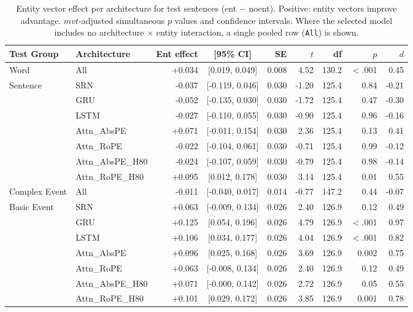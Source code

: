 \begin{table}[t]
\centering\small
\begin{tabular}{@{}llrcrrrrr@{}}
\toprule
\textbf{Test Group} & \textbf{Architecture} & \textbf{Ent effect} & \textbf{[95\% CI]} & \textbf{SE} & $t$ & \textbf{df} & $p$ & $d$ \\
\midrule
Word & All & +0.034 & [0.019, 0.049] & 0.008 & 4.52 & 130.2 & $<$.001 & 0.45 \\
\addlinespace
Sentence & SRN & -0.037 & [-0.119, 0.046] & 0.030 & -1.20 & 125.4 & 0.84 & -0.21 \\
 & GRU & -0.052 & [-0.135, 0.030] & 0.030 & -1.72 & 125.4 & 0.47 & -0.30 \\
 & LSTM & -0.027 & [-0.110, 0.055] & 0.030 & -0.90 & 125.4 & 0.96 & -0.16 \\
 & Attn\_AbsPE & +0.071 & [-0.011, 0.154] & 0.030 & 2.36 & 125.4 & 0.13 & 0.41 \\
 & Attn\_RoPE & -0.022 & [-0.104, 0.061] & 0.030 & -0.71 & 125.4 & 0.99 & -0.12 \\
 & Attn\_AbsPE\_H80 & -0.024 & [-0.107, 0.059] & 0.030 & -0.79 & 125.4 & 0.98 & -0.14 \\
 & Attn\_RoPE\_H80 & +0.095 & [0.012, 0.178] & 0.030 & 3.14 & 125.4 & 0.01 & 0.55 \\
\addlinespace
Complex Event & All & -0.011 & [-0.040, 0.017] & 0.014 & -0.77 & 147.2 & 0.44 & -0.07 \\
\addlinespace
Basic Event & SRN & +0.063 & [-0.009, 0.134] & 0.026 & 2.40 & 126.9 & 0.12 & 0.49 \\
 & GRU & +0.125 & [0.054, 0.196] & 0.026 & 4.79 & 126.9 & $<$.001 & 0.97 \\
 & LSTM & +0.106 & [0.034, 0.177] & 0.026 & 4.04 & 126.9 & $<$.001 & 0.82 \\
 & Attn\_AbsPE & +0.096 & [0.025, 0.168] & 0.026 & 3.69 & 126.9 & 0.002 & 0.75 \\
 & Attn\_RoPE & +0.063 & [-0.008, 0.134] & 0.026 & 2.40 & 126.9 & 0.12 & 0.49 \\
 & Attn\_AbsPE\_H80 & +0.071 & [-0.000, 0.142] & 0.026 & 2.72 & 126.9 & 0.05 & 0.55 \\
 & Attn\_RoPE\_H80 & +0.101 & [0.029, 0.172] & 0.026 & 3.85 & 126.9 & 0.001 & 0.78 \\
\bottomrule
\end{tabular}
\caption{Entity vector effect per architecture for test sentences (ent $-$ noent). Positive: entity vectors improve advantage. $mvt$-adjusted simultaneous $p$ values and confidence intervals. Where the selected model includes no architecture $\times$ entity interaction, a single pooled row (\texttt{All}) is shown.}
\label{tab:test_entity_effect}
\end{table}
